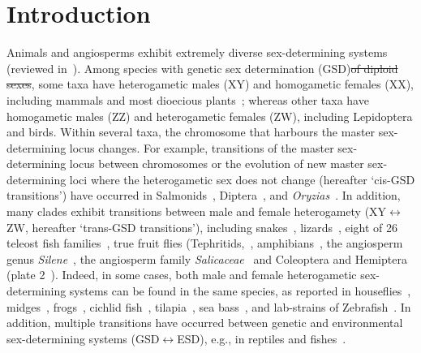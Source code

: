 \documentclass[10pt,letterpaper]{article}
\providecommand{\DIFaddtex}[1]{{\protect\color{blue}\uwave{#1}}} %
\providecommand{\DIFdeltex}[1]{{\protect\color{red}\sout{#1}}}                      %
\providecommand{\DIFaddbegin}{} %
\providecommand{\DIFaddend}{} %
\providecommand{\DIFdelbegin}{} %
\providecommand{\DIFdelend}{} %
\providecommand{\DIFadd}[1]{\texorpdfstring{\DIFaddtex{#1}}{#1}} %
\providecommand{\DIFdel}[1]{\texorpdfstring{\DIFdeltex{#1}}{}} %
\begin{document}
\linenumbers

\section*{Introduction}

Animals and angiosperms exhibit extremely diverse sex-determining systems (reviewed in~\cite{Bull:1983vi,Charlesworth:2010it,Beukeboom:2014vb,Bachtrog:2014bx}). 
Among species with genetic sex determination (GSD)\DIFdelbegin \DIFdel{of diploid sexes}\DIFdelend , some taxa have heterogametic males (XY) and homogametic females (XX), including %
mammals and most dioecious plants~\cite{Ming:2011iy}; whereas other taxa have homogametic males (ZZ) and heterogametic females (ZW), including Lepidoptera and birds. 
Within several taxa, the chromosome that harbours the master sex-determining locus changes. 
For example, transitions of the master sex-determining locus between chromosomes or the evolution of new master sex-determining loci where the heterogametic sex does not change (hereafter `cis-GSD transitions') have occurred in Salmonids~\cite{Li:2011fm,Yano:2012di}, Diptera~\cite{Vicoso:2015hf}, and \textit{Oryzias}~\cite{Myosho:2012fv}. 
In addition, many clades exhibit transitions between male and female heterogamety (XY$\leftrightarrow$ZW, hereafter `trans-GSD transitions'), including snakes~\cite{Gamble2017}, lizards~\cite{Ezaz:2009tk}, eight of 26 teleost fish families~\cite{Mank:2006bt}, true fruit flies (Tephritids,~\cite{Vicoso:2015hf}\DIFaddbegin \DIFadd{)}\DIFaddend , amphibians~\cite{Hillis:1990gu}, the angiosperm genus \textit{Silene}~\cite{Slancarova:2013dq}, the angiosperm family \textit{Salicaceae}~\cite{Pucholt2015,Pucholt2017} and Coleoptera and Hemiptera (plate 2~\cite{Beukeboom:2014vb}).
Indeed, in some cases, both male and female heterogametic sex-determining systems can be found in the same species, as reported in houseflies~\cite{Macdonald1978}, midges~\cite{Thompson1971}, frogs~\cite{Ogata:2007jm}, cichlid fish~\cite{Ser:2010iq}, tilapia~\cite{Lee2004}, sea bass~\cite{Vandeputte2007}, and lab-strains of Zebrafish~\cite{Liew2012,Wilson2014}.
In addition, multiple transitions have occurred between genetic and environmental sex-determining systems (GSD$\leftrightarrow$ESD), e.g., in reptiles and fishes~\cite{Conover:1987in,Mank:2006bt,Pokorna:2009ui,Ezaz:2009tk,Pen:2010kk,Holleley:2015hc}.
\DIFdelbegin %
\end{document}
